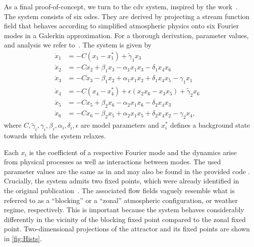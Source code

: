 As a final proof-of-concept, we turn to the \gls{cdv} system, inspired by the work~\textcite{dorringtonInteractionStochasticForcing2023}. The system consists of six \glspl{ode}. They are derived by projecting a stream function field that behaves according to simplified atmospheric physics onto six Fourier modes in a Galerkin approximation. For a thorough derivation, parameter values, and analysis we refer to~\textcite{deswartLoworderSpectralModels1988, crommelinMechanismAtmosphericRegime2004, dorringtonInteractionStochasticForcing2023}. The system is given by
\begin{align} \label{eq:CdV}
    \dot{x}_{1} & = -C(x_{1} - x_{1}^{*}) + \tilde{\gamma}_{1}x_{3}                                           \\
    \dot{x}_{2} & = -Cx_{2} + \beta_{1}x_{3} - \alpha_{1}x_{1}x_{3} - \delta_{1}x_{4}x_{6}                    \\
    \dot{x}_{3} & = -Cx_{3} - \beta_{1}x_{2} + \alpha_{1}x_{1}x_{2} + \delta_{1}x_{4}x_{5} - \gamma_{1}x_{1}  \\
    \dot{x}_{4} & = -C(x_{4} - x_{4}^{*}) + \epsilon(x_{2}x_{6} - x_{3}x_{5}) + \tilde{\gamma}_{2}x_{6}       \\
    \dot{x}_{5} & = -Cx_{5} + \beta_{2}x_{6} - \alpha_{2}x_{1}x_{6} - \delta_{2}x_{4}x_{3}                    \\
    \dot{x}_{6} & = -Cx_{6} - \beta_{2}x_{5} + \alpha_{2}x_{1}x_{5} + \delta_{2}x_{4}x_{2} - \gamma_{2}x_{4},
\end{align}
where $C, \tilde\gamma_i, \gamma_i, \beta_i, \alpha_i, \delta_i, \epsilon$ are model parameters and $x^*_i$ defines a background state towards which the system relaxes.

Each $x_i$ is the coefficient of a respective Fourier mode and the dynamics arise from physical processes as well as interactions between modes. The used parameter values are the same as in \textcite{dorringtonInteractionStochasticForcing2023} and may also be found in the provided code \parencite{schoellerCodeNoiseinducedEnhancement2026}. Crucially, the system admits two fixed points, which were already identified in the original publication~\parencite{charneyMultipleFlowEquilibria1979}. The associated flow fields vaguely resemble what is referred to as a \enquote{blocking} or a \enquote{zonal} atmospheric configuration, or weather regime, respectively. This is important because the system behaves considerably differently in the vicinity of the blocking fixed point compared to the zonal fixed point. Two-dimensional projections of the attractor and its fixed points are shown in \cref{fig:Hists}.

